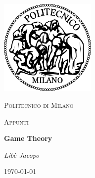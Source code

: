 
\begin{titlepage}
    \centering
    \includegraphics[width=0.35\textwidth]{images/logo_poli.png}\par\vspace{1cm}
    {\scshape\LARGE Politecnico di Milano \par}
    \vspace{1cm}
    {\scshape\Large Appunti \par}
    \vspace{1.5cm}
    {\huge\bfseries Game Theory\par}
    \vspace{2cm}
    {\Large\itshape Libè Jacopo\par}
    \vfill
    {\large \today\par}
\end{titlepage}
